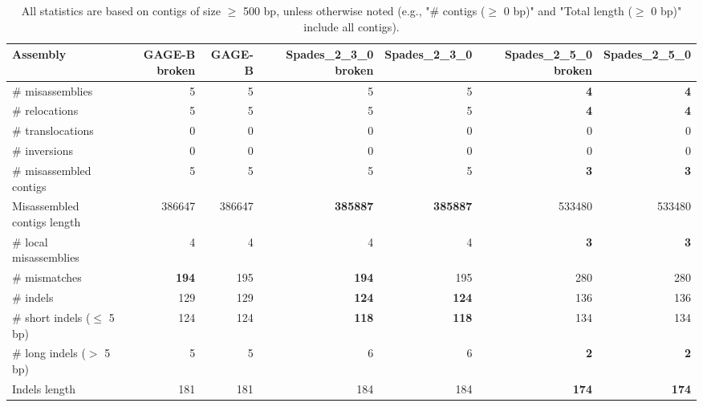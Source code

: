 \documentclass[12pt,a4paper]{article}
\begin{document}
\begin{table}[ht]
\begin{center}
\caption{All statistics are based on contigs of size $\geq$ 500 bp, unless otherwise noted (e.g., "\# contigs ($\geq$ 0 bp)" and "Total length ($\geq$ 0 bp)" include all contigs).}
\begin{tabular}{|l*{6}{|r}|}
\hline
Assembly & GAGE-B broken & GAGE-B & Spades\_2\_3\_0 broken & Spades\_2\_3\_0 & Spades\_2\_5\_0 broken & Spades\_2\_5\_0 \\ \hline
\# misassemblies & 5 & 5 & 5 & 5 & {\bf 4} & {\bf 4} \\ \hline
\hspace{5mm}\# relocations & 5 & 5 & 5 & 5 & {\bf 4} & {\bf 4} \\ \hline
\hspace{5mm}\# translocations & 0 & 0 & 0 & 0 & 0 & 0 \\ \hline
\hspace{5mm}\# inversions & 0 & 0 & 0 & 0 & 0 & 0 \\ \hline
\# misassembled contigs & 5 & 5 & 5 & 5 & {\bf 3} & {\bf 3} \\ \hline
Misassembled contigs length & 386647 & 386647 & {\bf 385887} & {\bf 385887} & 533480 & 533480 \\ \hline
\# local misassemblies & 4 & 4 & 4 & 4 & {\bf 3} & {\bf 3} \\ \hline
\# mismatches & {\bf 194} & 195 & {\bf 194} & 195 & 280 & 280 \\ \hline
\# indels & 129 & 129 & {\bf 124} & {\bf 124} & 136 & 136 \\ \hline
\hspace{5mm}\# short indels ($\leq$ 5 bp) & 124 & 124 & {\bf 118} & {\bf 118} & 134 & 134 \\ \hline
\hspace{5mm}\# long indels ($>$ 5 bp) & 5 & 5 & 6 & 6 & {\bf 2} & {\bf 2} \\ \hline
Indels length & 181 & 181 & 184 & 184 & {\bf 174} & {\bf 174} \\ \hline
\end{tabular}
\end{center}
\end{table}
\end{document}
